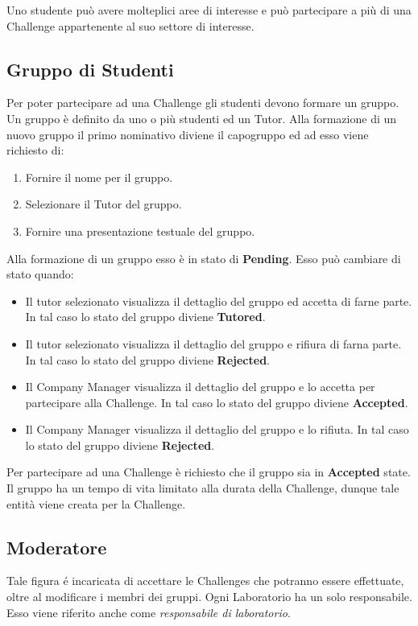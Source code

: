Uno studente può avere molteplici aree di interesse e può partecipare a più di una Challenge appartenente al suo settore di interesse.

\subsection{Gruppo di Studenti}
Per poter partecipare ad una Challenge gli studenti devono formare un gruppo. Un gruppo è definito da uno o più studenti ed un Tutor. 
Alla formazione di un nuovo gruppo il primo nominativo diviene il capogruppo ed ad esso viene richiesto di:
 \begin{enumerate}
        \item Fornire il nome per il gruppo.
        \item Selezionare il Tutor del gruppo. 
        \item Fornire una presentazione testuale del gruppo. 
\end{enumerate}

Alla formazione di un gruppo esso è in stato di \textbf{Pending}. Esso può cambiare di stato quando:
\begin{itemize}
    \item Il tutor selezionato visualizza il dettaglio del gruppo ed accetta di farne parte. In tal caso lo stato del gruppo diviene \textbf{Tutored}. 
    \item Il tutor selezionato visualizza il dettaglio del gruppo e rifiura di farna parte. In tal caso lo stato del gruppo diviene \textbf{Rejected}. 
    \item Il Company Manager visualizza il dettaglio del gruppo e lo accetta per partecipare alla Challenge. In tal caso lo stato del gruppo diviene \textbf{Accepted}. 
    \item Il Company Manager visualizza il dettaglio del gruppo e lo rifiuta. In tal caso lo stato del gruppo diviene \textbf{Rejected}. 
\end{itemize}

Per partecipare ad una Challenge è richiesto che il gruppo sia in \textbf{Accepted} state. Il gruppo ha un tempo di vita limitato alla durata della Challenge, dunque tale entità viene creata per la Challenge.



\subsection{Moderatore}
Tale figura é incaricata di accettare le Challenges che potranno essere effettuate, oltre al modificare i membri dei gruppi. Ogni Laboratorio ha un solo responsabile. Esso viene riferito anche come \textit{responsabile di laboratorio}.

